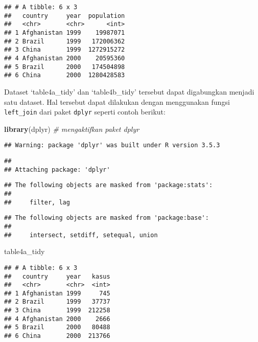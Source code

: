 \documentclass[]{article}
\newenvironment{Shaded}{\begin{snugshade}}{\end{snugshade}}
\newcommand{\CommentTok}[1]{\textcolor[rgb]{0.56,0.35,0.01}{\textit{#1}}}
\newcommand{\KeywordTok}[1]{\textcolor[rgb]{0.13,0.29,0.53}{\textbf{#1}}}
\newcommand{\NormalTok}[1]{#1}
\begin{document}
\begin{verbatim}
## # A tibble: 6 x 3
##   country     year  population
##   <chr>       <chr>      <int>
## 1 Afghanistan 1999    19987071
## 2 Brazil      1999   172006362
## 3 China       1999  1272915272
## 4 Afghanistan 2000    20595360
## 5 Brazil      2000   174504898
## 6 China       2000  1280428583
\end{verbatim}

Dataset `table4a\_tidy' dan `table4b\_tidy' tersebut dapat digabungkan
menjadi satu dataset. Hal tersebut dapat dilakukan dengan menggunakan
fungsi \texttt{left\_join} dari paket \texttt{dplyr} seperti contoh
berikut:

\begin{Shaded}
\begin{Highlighting}[]
\KeywordTok{library}\NormalTok{(dplyr) }\CommentTok{# mengaktifkan paket dplyr}
\end{Highlighting}
\end{Shaded}

\begin{verbatim}
## Warning: package 'dplyr' was built under R version 3.5.3
\end{verbatim}

\begin{verbatim}
## 
## Attaching package: 'dplyr'
\end{verbatim}

\begin{verbatim}
## The following objects are masked from 'package:stats':
## 
##     filter, lag
\end{verbatim}

\begin{verbatim}
## The following objects are masked from 'package:base':
## 
##     intersect, setdiff, setequal, union
\end{verbatim}

\begin{Shaded}
\begin{Highlighting}[]
\NormalTok{table4a_tidy}
\end{Highlighting}
\end{Shaded}

\begin{verbatim}
## # A tibble: 6 x 3
##   country     year   kasus
##   <chr>       <chr>  <int>
## 1 Afghanistan 1999     745
## 2 Brazil      1999   37737
## 3 China       1999  212258
## 4 Afghanistan 2000    2666
## 5 Brazil      2000   80488
## 6 China       2000  213766
\end{verbatim}
\end{document}
